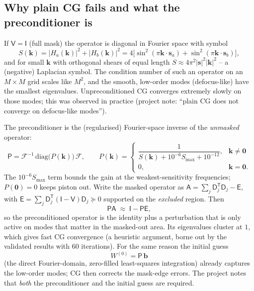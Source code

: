 \documentclass[11pt,a4paper]{article}
\theoremstyle{definition}
\newcommand{\vk}{\bm{k}}
\newcommand{\vs}{\bm{s}}
\newcommand{\FT}{\mathcal{F}}
\newcommand{\IFT}{\mathcal{F}^{-1}}
\newcommand{\Dop}{\mathsf{D}}
\newcommand{\Vop}{\mathsf{V}}
\newcommand{\Aop}{\mathsf{A}}
\newcommand{\Pop}{\mathsf{P}}
\begin{document}
\subsection{Why plain CG fails and what the preconditioner is}
\label{sec:pcg}
If $\Vop=\mathsf I$ (full mask) the operator is diagonal in Fourier space with symbol
\begin{equation}
S(\vk)=|H_a(\vk)|^2+|H_b(\vk)|^2=4\big[\sin^2(\pi\vk\cdot\vs_a)+\sin^2(\pi\vk\cdot\vs_b)\big],
\end{equation}
and for small $\vk$ with orthogonal shears of equal length $S\approx4\pi^2|\vs|^2|\vk|^2$ -- a (negative) Laplacian symbol. The condition number of such an operator on an $M\times M$ grid scales like $M^2$, and the
smooth, low-order modes (defocus-like) have the smallest eigenvalues. Unpreconditioned CG converges extremely slowly on those modes; this was observed in practice (project note: ``plain CG does not converge on defocus-like modes'').

The preconditioner is the (regularised) Fourier-space inverse of the \emph{unmasked} operator:
\begin{equation}
\Pop=\IFT\,\mathrm{diag}\big(P(\vk)\big)\,\FT,\qquad
P(\vk)=\begin{cases}\dfrac1{S(\vk)+10^{-6}S_{\max}+10^{-12}},&\vk\ne\bm0\\[2mm]0,&\vk=\bm 0.\end{cases}
\label{eq:precond}
\end{equation}
The $10^{-6}S_{\max}$ term bounds the gain at the weakest-sensitivity frequencies; $P(\bm0)=0$ keeps piston out.
Write the masked operator as $\Aop=\sum_j\Dop_j^{\mathsf T}\Dop_j-\mathsf E$, with $\mathsf E=\sum_j\Dop_j^{\mathsf T}(\mathsf I-\Vop)\Dop_j\succeq0$ supported on the \emph{excluded} region. Then
\[
\Pop\Aop\;\approx\;\mathsf I-\Pop\mathsf E ,
\]
so the preconditioned operator is the identity plus a perturbation that is only active on modes that matter in the masked-out area. Its eigenvalues cluster at $1$, which gives fast CG convergence
(a heuristic argument, borne out by the validated results with $60$ iterations). For the same reason the initial guess
\begin{equation}
W^{(0)}=\Pop\,\bm b
\end{equation}
(the direct Fourier-domain, zero-filled least-squares integration) already captures the low-order modes; CG then corrects the mask-edge errors. The project notes that \emph{both} the preconditioner and the initial guess are required.
\end{document}
